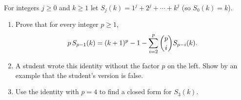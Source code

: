 For integers $j\ge0$ and $k\ge1$ let $S_j(k)=1^j+2^j+\cdots+k^j$ (so $S_0(k)=k$).
\begin{enumerate}
\item[(a)] Prove that for every integer $p\ge1$,
\[
p\,S_{p-1}(k)=(k+1)^p-1-\sum_{i=2}^{p}\dbinom pi S_{p-i}(k).
\]
\item[(b)] A student wrote this identity without the factor $p$ on the left. Show by an example that the student's version is false.
\item[(c)] Use the identity with $p=4$ to find a closed form for $S_3(k)$.
\end{enumerate}

